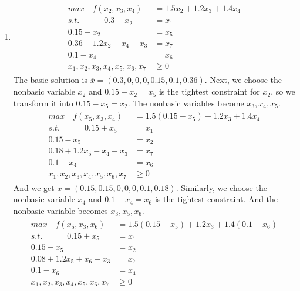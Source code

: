 \documentclass[12pt,a4paper]{article}
\makeatletter
\newtheorem*{solution}{Solution}
\theoremstyle{definition}
\renewenvironment{solution}[1][Solution] {\par\pushQED{\qed}\normalfont\topsep6\p@\@plus6\p@\relax\trivlist\item[\hskip\labelsep\bfseries#1\@addpunct{.}]\ignorespaces}{\popQED\endtrivlist\@endpefalse} \makeatother
\makeatother
\begin{document}
\begin{enumerate}
\begin{solution}
\begin{enumerate}
        \begin{align*}
            \begin{split}
                max \quad f(x_2,x_3,x_4) &= 1.5 x_2 + 1.2x_3+1.4x_4\\
                s.t.\quad\quad\quad 0.3-x_2&= x_1\\
                0.15-x_2 &= x_5\\
                0.36-1.2x_2 -x_4-x_3&=x_7\\
                0.1 -x_4 &= x_6\\
                x_1,x_2,x_3,x_4,x_5,x_6,x_7&\ge 0
            \end{split}
        \end{align*}
        The basic solution is $\overline{x} = (0.3,0,0,0,0.15,0.1,0.36)$. Next, we choose the nonbasic variable $x_2$ and $0.15-x_2=x_5$ is the tightest constraint for $x_2$, so we transform it into $0.15-x_5=x_2$. The nonbasic variables become $x_3,x_4,x_5$.
        \begin{align*}
            \begin{split}
                max \quad f(x_5,x_3,x_4) &= 1.5(0.15-x_5) + 1.2x_3+1.4x_4\\
                s.t.\quad\quad\quad 0.15+x_5&= x_1\\
                0.15-x_5 &= x_2\\
                0.18+1.2x_5 -x_4-x_3&=x_7\\
                0.1 -x_4 &= x_6\\
                x_1,x_2,x_3,x_4,x_5,x_6,x_7&\ge 0
            \end{split}
        \end{align*}
        And we get $\overline{x} = (0.15,0.15,0,0,0,0.1,0.18)$. Similarly, we choose the nonbasic variable $x_4$ and $0.1 -x_4 = x_6$ is the tightest constraint. And the nonbasic variable becomes $x_3,x_5,x_6$.
        \begin{align*}
            \begin{split}
                max \quad f(x_5,x_3,x_6) &= 1.5(0.15-x_5) + 1.2x_3+1.4(0.1-x_6)\\
                s.t.\quad\quad\quad 0.15+x_5&= x_1\\
                0.15-x_5 &= x_2\\
                0.08+1.2x_5 +x_6-x_3&=x_7\\
                0.1 -x_6 &= x_4\\
                x_1,x_2,x_3,x_4,x_5,x_6,x_7&\ge 0
            \end{split}

\end{align*}
\end{enumerate}
\end{solution}
\end{enumerate}
\end{document}
